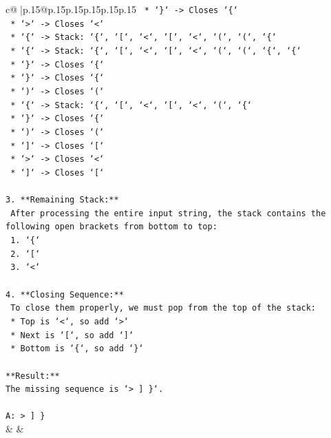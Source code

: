 \documentclass{article}
\begin{document}
{\begin{supertabular}{c@{$\;$}|p{.15\linewidth}@{}p{.15\linewidth}p{.15\linewidth}p{.15\linewidth}p{.15\linewidth}p{.15\linewidth}}
{{{\texttt{    *   `\}` {-}> Closes `\{`} \\
\texttt{    *   `>` {-}> Closes `<`} \\
\texttt{    *   `\{` {-}> Stack: `\{`, `{[}`, `<`, `{[}`, `<`, `(`, `(`, `\{`} \\
\texttt{    *   `\{` {-}> Stack: `\{`, `{[}`, `<`, `{[}`, `<`, `(`, `(`, `\{`, `\{`} \\
\texttt{    *   `\}` {-}> Closes `\{`} \\
\texttt{    *   `\}` {-}> Closes `\{`} \\
\texttt{    *   `)` {-}> Closes `(`} \\
\texttt{    *   `\{` {-}> Stack: `\{`, `{[}`, `<`, `{[}`, `<`, `(`, `\{`} \\
\texttt{    *   `\}` {-}> Closes `\{`} \\
\texttt{    *   `)` {-}> Closes `(`} \\
\texttt{    *   `{]}` {-}> Closes `{[}`} \\
\texttt{    *   `>` {-}> Closes `<`} \\
\texttt{    *   `{]}` {-}> Closes `{[}`} \\
\\ 
\texttt{3.  **Remaining Stack:**} \\
\texttt{    After processing the entire input string, the stack contains the following open brackets from bottom to top:} \\
\texttt{    1.  `\{`} \\
\texttt{    2.  `{[}`} \\
\texttt{    3.  `<`} \\
\\ 
\texttt{4.  **Closing Sequence:**} \\
\texttt{    To close them properly, we must pop from the top of the stack:} \\
\texttt{    *   Top is `<`, so add `>`} \\
\texttt{    *   Next is `{[}`, so add `{]}`} \\
\texttt{    *   Bottom is `\{`, so add `\}`} \\
\\ 
\texttt{**Result:**} \\
\texttt{The missing sequence is `> {]} \}`.} \\
\\ 
\texttt{A: > {]} \}} \\
            }
        }
    }
    & & \\ \\


\end{supertabular}}
\end{document}

